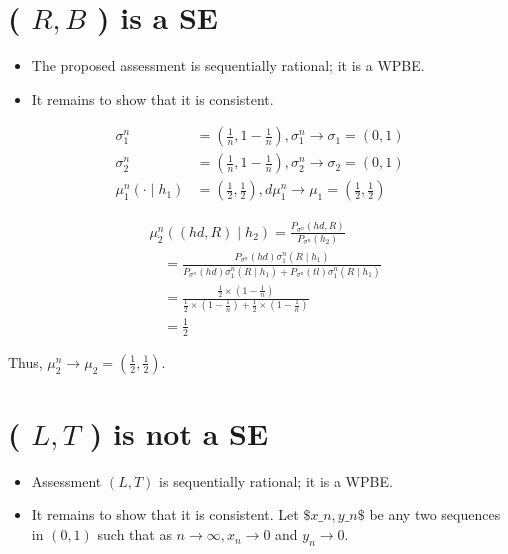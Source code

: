 \documentclass[10pt]{article}
\begin{document}
\section*{( $R, B$ ) is a SE}
\begin{itemize}
  \item The proposed assessment is sequentially rational; it is a WPBE.
  \item It remains to show that it is consistent.
\end{itemize}

$$
\begin{aligned}
\sigma_{1}^{n} & =\left(\frac{1}{n}, 1-\frac{1}{n}\right), \sigma_{1}^{n} \rightarrow \sigma_{1}=(0,1) \\
\sigma_{2}^{n} & =\left(\frac{1}{n}, 1-\frac{1}{n}\right), \sigma_{2}^{n} \rightarrow \sigma_{2}=(0,1) \\
\mu_{1}^{n}\left(\cdot \mid h_{1}\right) & =\left(\frac{1}{2}, \frac{1}{2}\right), d \mu_{1}^{n} \rightarrow \mu_{1}=\left(\frac{1}{2}, \frac{1}{2}\right)
\end{aligned}
$$

$$
\begin{aligned}
& \mu_{2}^{n}\left((h d, R) \mid h_{2}\right)=\frac{P_{\sigma^{n}}(h d, R)}{P_{\sigma^{n}}\left(h_{2}\right)} \\
& \quad=\frac{P_{\sigma^{n}}(h d) \sigma_{1}^{n}\left(R \mid h_{1}\right)}{P_{\sigma^{n}}(h d) \sigma_{1}^{n}\left(R \mid h_{1}\right)+P_{\sigma^{n}}(t l) \sigma_{1}^{n}\left(R \mid h_{1}\right)} \\
& \quad=\frac{\frac{1}{2} \times\left(1-\frac{1}{n}\right)}{\frac{1}{2} \times\left(1-\frac{1}{n}\right)+\frac{1}{2} \times\left(1-\frac{1}{n}\right)} \\
& \quad=\frac{1}{2}
\end{aligned}
$$

Thus, $\mu_{2}^{n} \rightarrow \mu_{2}=\left(\frac{1}{2}, \frac{1}{2}\right)$.

\section*{( $L, T$ ) is not a SE}
\begin{itemize}
  \item Assessment $(L, T)$ is sequentially rational; it is a WPBE.
  \item It remains to show that it is consistent. Let $\$ x \_n, y \_n \$$ be any two sequences in $(0,1)$ such that as $n \rightarrow \infty, x_{n} \rightarrow 0$ and $y_{n} \rightarrow 0$.
\end{itemize}
\end{document}
